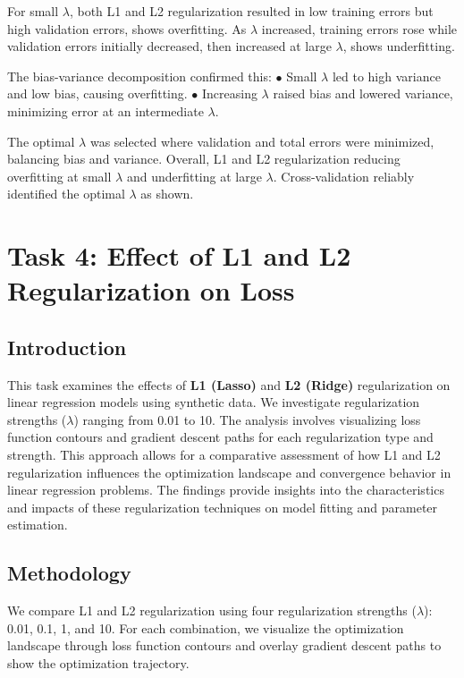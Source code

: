 \documentclass{article}
\begin{document}
For small $\lambda$, both L1 and L2 regularization resulted in low training errors but high validation errors, shows overfitting. As $\lambda$ increased, training errors rose while validation errors initially decreased, then increased at large $\lambda$, shows underfitting.

The bias-variance decomposition confirmed this: $\bullet$ Small $\lambda$ led to high variance and low bias, causing overfitting. $\bullet$ Increasing $\lambda$ raised bias and lowered variance, minimizing error at an intermediate $\lambda$.

The optimal $\lambda$ was selected where validation and total errors were minimized, balancing bias and variance. Overall, L1 and L2 regularization reducing overfitting at small $\lambda$ and underfitting at large $\lambda$. Cross-validation reliably identified the optimal $\lambda$ as shown.


\section{Task 4: Effect of L1 and L2 Regularization on Loss}

\subsection{Introduction}
\noindent This task examines the effects of \textbf{L1 (Lasso)} and \textbf{L2 (Ridge)} regularization on linear regression models using synthetic data. We investigate regularization strengths ($\lambda$) ranging from 0.01 to 10. The analysis involves visualizing loss function contours and gradient descent paths for each regularization type and strength. This approach allows for a comparative assessment of how L1 and L2 regularization influences the optimization landscape and convergence behavior in linear regression problems. The findings provide insights into the characteristics and impacts of these regularization techniques on model fitting and parameter estimation.

\subsection{Methodology}
\noindent We compare L1 and L2 regularization using four regularization strengths ($\lambda$): 0.01, 0.1, 1, and 10. For each combination, we visualize the optimization landscape through loss function contours and overlay gradient descent paths to show the optimization trajectory.
\end{document}
